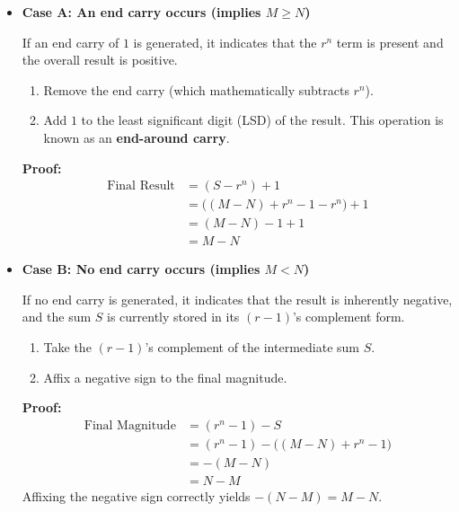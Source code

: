 \documentclass[12pt,a3paper]{article}
\begin{document}
\begin{enumerate}
\begin{tcolorbox}[enhanced,breakable,ansbox,colback=cD!4,colframe=cD,boxrule=0.8pt,arc=5pt,title={\textbf{Answer}},fonttitle=\bfseries\color{white},colbacktitle=cD]
\begin{enumerate}
    \vspace{0.5em}
    \begin{itemize}
        \item \textbf{Case A: An end carry occurs (implies $M \ge N$)}
        \vspace{0.25em}
        
        If an end carry of $1$ is generated, it indicates that the $r^n$ term is present and the overall result is positive. 
        \begin{enumerate}[label=\roman*.]
            \item Remove the end carry (which mathematically subtracts $r^n$).
            \item Add $1$ to the least significant digit (LSD) of the result. This operation is known as an \textbf{end-around carry}.
        \end{enumerate}
        \textbf{Proof:}
        \begin{align*}
            \text{Final Result} &= (S - r^n) + 1 \\
            &= \big((M - N) + r^n - 1 - r^n\big) + 1 \\
            &= (M - N) - 1 + 1 \\
            &= M - N
        \end{align*}

        \vspace{0.5em}
        \item \textbf{Case B: No end carry occurs (implies $M < N$)}
        \vspace{0.25em}
        
        If no end carry is generated, it indicates that the result is inherently negative, and the sum $S$ is currently stored in its $(r-1)$'s complement form.
        \begin{enumerate}[label=\roman*.]
            \item Take the $(r-1)$'s complement of the intermediate sum $S$.
            \item Affix a negative sign to the final magnitude.
        \end{enumerate}
        \textbf{Proof:}
        \begin{align*}
            \text{Final Magnitude} &= (r^n - 1) - S \\
            &= (r^n - 1) - \big((M - N) + r^n - 1\big) \\
            &= -(M - N) \\
            &= N - M
        \end{align*}
        Affixing the negative sign correctly yields $-(N - M) = M - N$.
    \end{itemize}
\end{enumerate}


\end{tcolorbox}
\end{enumerate}
\end{document}
